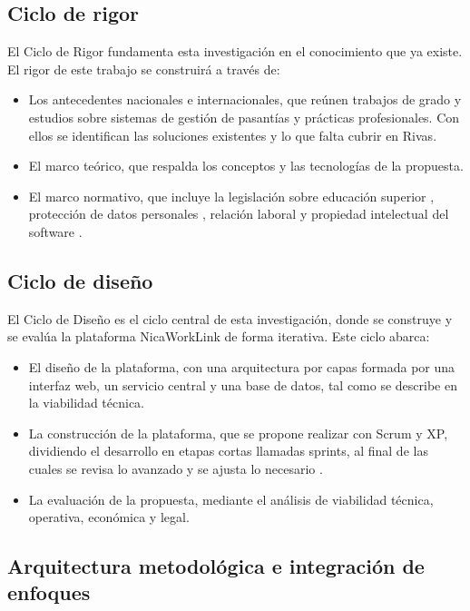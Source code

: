 \subsection{Ciclo de rigor}

El Ciclo de Rigor fundamenta esta investigación en el conocimiento que ya existe. El rigor de este trabajo se construirá a través de:

\begin{itemize}
	\item Los antecedentes nacionales e internacionales, que reúnen trabajos de grado y estudios sobre sistemas de gestión de pasantías y prácticas profesionales. Con ellos se identifican las soluciones existentes y lo que falta cubrir en Rivas.
	\item El marco teórico, que respalda los conceptos y las tecnologías de la propuesta.
	\item El marco normativo, que incluye la legislación sobre educación superior \parencite{ley89_1990,ley582}, protección de datos personales \parencite{ley787_2012}, relación laboral \parencite{ley185_1996} y propiedad intelectual del software \parencite{ley312_1999}.
\end{itemize}

\subsection{Ciclo de diseño}

El Ciclo de Diseño es el ciclo central de esta investigación, donde se construye y se evalúa la plataforma NicaWorkLink de forma iterativa. Este ciclo abarca:

\begin{itemize}
	\item El diseño de la plataforma, con una arquitectura por capas formada por una interfaz web, un servicio central y una base de datos, tal como se describe en la viabilidad técnica.
	\item La construcción de la plataforma, que se propone realizar con Scrum y XP, dividiendo el desarrollo en etapas cortas llamadas sprints, al final de las cuales se revisa lo avanzado y se ajusta lo necesario \parencite{schwaber2020,beck2000}.
	\item La evaluación de la propuesta, mediante el análisis de viabilidad técnica, operativa, económica y legal.
\end{itemize}

\subsection{Arquitectura metodológica e integración de enfoques}

